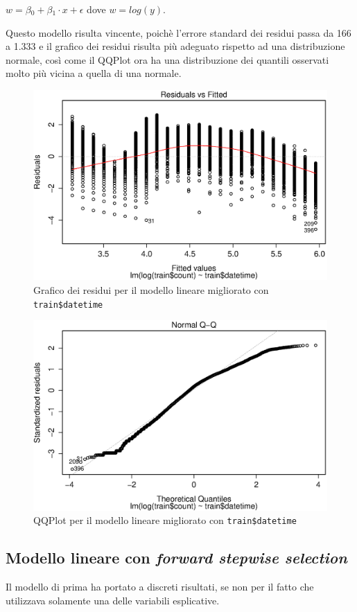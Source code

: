 \centering $ w = \beta{}_0 + \beta{}_1 \cdot{} x + \epsilon{} $
\flushleft dove $ w = log(y) $.

Questo modello risulta vincente, poichè l'errore standard dei residui passa da
166 a 1.333 e il grafico dei residui risulta più adeguato rispetto ad una
distribuzione normale, così come il QQPlot ora ha una distribuzione dei
quantili osservati molto più vicina a quella di una normale.

\begin{figure}[H]
  \centering
  \includegraphics[width=.7\columnwidth]{images/simple-lm-log-residuals.eps}
  \caption{Grafico dei residui per il modello lineare migliorato con
  \texttt{train\$datetime}}\label{fig:simpl-lm-log-residuals}
\end{figure}

\begin{figure}[H]
  \centering
  \includegraphics[width=.7\columnwidth]{images/simple-lm-log-qqplot.eps}
  \caption{QQPlot per il modello lineare migliorato con
  \texttt{train\$datetime}}\label{fig:simpl-lm-log-qqplot}
\end{figure}

\subsection{Modello lineare con \emph{forward stepwise selection}}\label{sec:mod-lin-fwd-sw}
Il modello di prima ha portato a discreti risultati, se non per il fatto che
utilizzava solamente una delle variabili esplicative.

